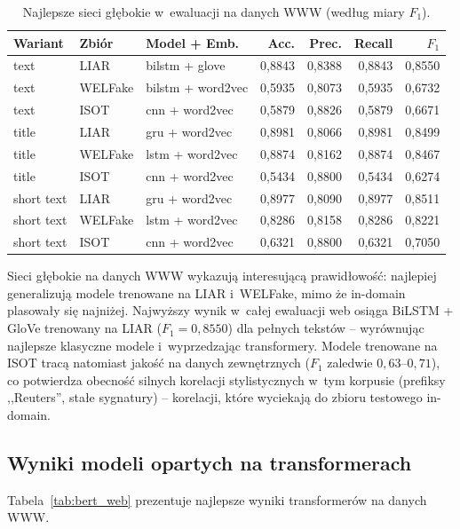 \documentclass[oneside,polski,logo]{amuthesis}
\begin{document}
\begin{table}[ht]
\centering
\caption{Najlepsze sieci głębokie w~ewaluacji na danych WWW
(według miary $F_1$).}
\label{tab:dl_web}
\begin{tabular}{lllrrrr}
\toprule
Wariant & Zbiór & Model + Emb. & Acc. & Prec. & Recall & $F_1$ \\
\midrule
text       & LIAR    & bilstm + glove    & 0,8843 & 0,8388 & 0,8843 & 0,8550 \\
text       & WELFake & bilstm + word2vec & 0,5935 & 0,8073 & 0,5935 & 0,6732 \\
text       & ISOT    & cnn + word2vec    & 0,5879 & 0,8826 & 0,5879 & 0,6671 \\
title      & LIAR    & gru + word2vec    & 0,8981 & 0,8066 & 0,8981 & 0,8499 \\
title      & WELFake & lstm + word2vec   & 0,8874 & 0,8162 & 0,8874 & 0,8467 \\
title      & ISOT    & cnn + word2vec    & 0,5434 & 0,8800 & 0,5434 & 0,6274 \\
short text & LIAR    & gru + word2vec    & 0,8977 & 0,8090 & 0,8977 & 0,8511 \\
short text & WELFake & lstm + word2vec   & 0,8286 & 0,8158 & 0,8286 & 0,8221 \\
short text & ISOT    & cnn + word2vec    & 0,6321 & 0,8800 & 0,6321 & 0,7050 \\
\bottomrule
\end{tabular}
\end{table}

Sieci głębokie na danych WWW wykazują interesującą prawidłowość:
najlepiej generalizują modele trenowane na LIAR i~WELFake, mimo
że in-domain plasowały się najniżej. Najwyższy wynik w~całej
ewaluacji web osiąga BiLSTM + GloVe trenowany na LIAR
(\(F_1 = 0{,}8550\)) dla pełnych tekstów -- wyrównując najlepsze
klasyczne modele i~wyprzedzając transformery. Modele trenowane
na ISOT tracą natomiast jakość na danych zewnętrznych
(\(F_1\) zaledwie \(0{,}63\)--\(0{,}71\)), co potwierdza obecność
silnych korelacji stylistycznych w~tym korpusie (prefiksy ,,Reuters'',
stałe sygnatury) -- korelacji, które wyciekają do zbioru testowego
in-domain.

\subsection{Wyniki modeli opartych na transformerach}
\label{sec:wyniki_www_transformery}

Tabela~\ref{tab:bert_web} prezentuje najlepsze wyniki transformerów
na danych WWW.
\end{document}
